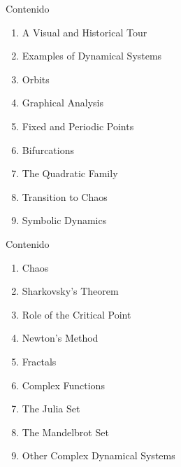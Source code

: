 \begin{frame}{Contenido}
\begin{enumerate}
\item A Visual and Historical Tour
\item Examples of Dynamical Systems
\item Orbits
\item Graphical Analysis
\item Fixed and Periodic Points
\item Bifurcations
\item The Quadratic Family
\item Transition to Chaos
\item Symbolic Dynamics
\end{enumerate}
\end{frame}

\begin{frame}{Contenido}
\begin{enumerate}[resume]
\item Chaos
\item Sharkovsky's Theorem
\item Role of the Critical Point
\item Newton's Method
\item Fractals
\item Complex Functions
\item The Julia Set
\item The Mandelbrot Set
\item Other Complex Dynamical Systems
\end{enumerate}
\end{frame}

